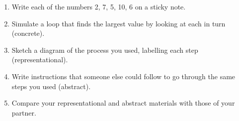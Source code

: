 \begin{enumerate}

\item
  Write each of the numbers 2, 7, 5, 10, 6 on a sticky note.

\item
  Simulate a loop that finds the largest value by looking at each in
  turn (concrete).

\item
  Sketch a diagram of the process you used, labelling each step
  (representational).

\item
  Write instructions that someone else could follow to go through the
  same steps you used (abstract).

\item
  Compare your representational and abstract materials with those of
  your partner.

\end{enumerate}
